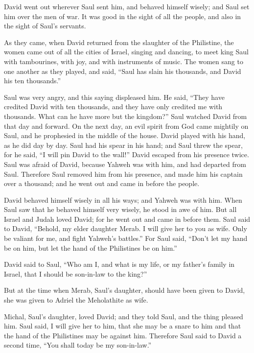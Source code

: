  David went out wherever Saul sent him, and behaved himself
wisely; and Saul set him over the men of war. It was good in the sight
of all the people, and also in the sight of Saul's servants.

 As they came, when David returned from the slaughter of the
Philistine, the women came out of all the cities of Israel, singing and
dancing, to meet king Saul with tambourines, with joy, and with
instruments of music.  The women sang to one another as they
played, and said, ``Saul has slain his thousands, and David his ten
thousands.''

 Saul was very angry, and this saying displeased him. He
said, ``They have credited David with ten thousands, and they have only
credited me with thousands. What can he have more but the kingdom?''
 Saul watched David from that day and forward. 
On the next day, an evil spirit from God came mightily on Saul, and he
prophesied in the middle of the house. David played with his hand, as he
did day by day. Saul had his spear in his hand;  and Saul
threw the spear, for he said, ``I will pin David to the wall!'' David
escaped from his presence twice.  Saul was afraid of David,
because Yahweh was with him, and had departed from Saul. 
Therefore Saul removed him from his presence, and made him his captain
over a thousand; and he went out and came in before the people.

 David behaved himself wisely in all his ways; and Yahweh
was with him.  When Saul saw that he behaved himself very
wisely, he stood in awe of him.  But all Israel and Judah
loved David; for he went out and came in before them.  Saul
said to David, ``Behold, my elder daughter Merab. I will give her to you
as wife. Only be valiant for me, and fight Yahweh's battles.'' For Saul
said, ``Don't let my hand be on him, but let the hand of the Philistines
be on him.''

 David said to Saul, ``Who am I, and what is my life, or my
father's family in Israel, that I should be son-in-law to the king?''

 But at the time when Merab, Saul's daughter, should have
been given to David, she was given to Adriel the Meholathite as wife.

 Michal, Saul's daughter, loved David; and they told Saul,
and the thing pleased him.  Saul said, I will give her to
him, that she may be a snare to him and that the hand of the Philistines
may be against him. Therefore Saul said to David a second time, ``You
shall today be my son-in-law.''

